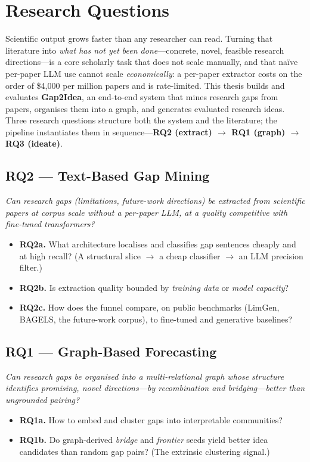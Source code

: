 \section{Research Questions}
\label{sec:rq}

Scientific output grows faster than any researcher can read. Turning that
literature into \emph{what has not yet been done}---concrete, novel, feasible
research directions---is a core scholarly task that does not scale manually, and
that na\"ive per-paper LLM use cannot scale \emph{economically}: a per-paper
extractor costs on the order of \$4{,}000 per million papers and is rate-limited.
This thesis builds and evaluates \textbf{Gap2Idea}, an end-to-end system that
mines research gaps from papers, organises them into a graph, and generates
evaluated research ideas. Three research questions structure both the system and
the literature; the pipeline instantiates them in sequence---\textbf{RQ2
(extract) $\rightarrow$ RQ1 (graph) $\rightarrow$ RQ3 (ideate)}.

\subsection{RQ2 --- Text-Based Gap Mining}
\emph{Can research gaps (limitations, future-work directions) be extracted from
scientific papers at corpus scale without a per-paper LLM, at a quality
competitive with fine-tuned transformers?}
\begin{itemize}
  \item \textbf{RQ2a.} What architecture localises and classifies gap sentences
        cheaply and at high recall? (A structural slice $\rightarrow$ a cheap
        classifier $\rightarrow$ an LLM precision filter.)
  \item \textbf{RQ2b.} Is extraction quality bounded by \emph{training data} or
        \emph{model capacity}?
  \item \textbf{RQ2c.} How does the funnel compare, on public benchmarks (LimGen,
        BAGELS, the future-work corpus), to fine-tuned and generative baselines?
\end{itemize}

\subsection{RQ1 --- Graph-Based Forecasting}
\emph{Can research gaps be organised into a multi-relational graph whose structure
identifies promising, novel directions---by recombination and bridging---better
than ungrounded pairing?}
\begin{itemize}
  \item \textbf{RQ1a.} How to embed and cluster gaps into interpretable
        communities?
  \item \textbf{RQ1b.} Do graph-derived \emph{bridge} and \emph{frontier} seeds
        yield better idea candidates than random gap pairs? (The extrinsic
        clustering signal.)
\end{itemize}

